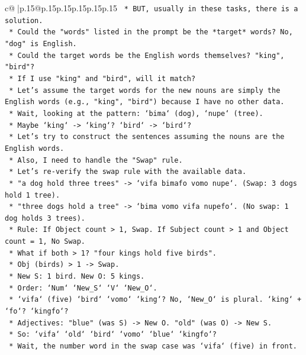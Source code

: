 \documentclass{article}
\begin{document}
{\begin{supertabular}{c@{$\;$}|p{.15\linewidth}@{}p{.15\linewidth}p{.15\linewidth}p{.15\linewidth}p{.15\linewidth}p{.15\linewidth}}
{{{\texttt{    *   BUT, usually in these tasks, there is a solution.} \\
\texttt{    *   Could the "words" listed in the prompt be the *target* words? No, "dog" is English.} \\
\texttt{    *   Could the target words be the English words themselves? "king", "bird"?} \\
\texttt{    *   If I use "king" and "bird", will it match?} \\
\texttt{    *   Let's assume the target words for the new nouns are simply the English words (e.g., "king", "bird") because I have no other data.} \\
\texttt{    *   Wait, looking at the pattern: `bima` (dog), `nupe` (tree).} \\
\texttt{    *   Maybe `king` {-}> `king`? `bird` {-}> `bird`?} \\
\texttt{    *   Let's try to construct the sentences assuming the nouns are the English words.} \\
\texttt{    *   Also, I need to handle the "Swap" rule.} \\
\texttt{    *   Let's re{-}verify the swap rule with the available data.} \\
\texttt{        *   "a dog hold three trees" {-}> `vifa bimafo vomo nupe`. (Swap: 3 dogs hold 1 tree).} \\
\texttt{        *   "three dogs hold a tree" {-}> `bima vomo vifa nupefo`. (No swap: 1 dog holds 3 trees).} \\
\texttt{        *   Rule: If Object count > 1, Swap. If Subject count > 1 and Object count = 1, No Swap.} \\
\texttt{        *   What if both > 1? "four kings hold five birds".} \\
\texttt{        *   Obj (birds) > 1 {-}> Swap.} \\
\texttt{        *   New S: 1 bird. New O: 5 kings.} \\
\texttt{        *   Order: `Num` `New\_S` `V` `New\_O`.} \\
\texttt{        *   `vifa` (five) `bird` `vomo` `king`? No, `New\_O` is plural. `king` + `fo`? `kingfo`?} \\
\texttt{        *   Adjectives: "blue" (was S) {-}> New O. "old" (was O) {-}> New S.} \\
\texttt{        *   So: `vifa` `old` `bird` `vomo` `blue` `kingfo`?} \\
\texttt{        *   Wait, the number word in the swap case was `vifa` (five) in front.} \\
}}}
\end{supertabular}}
\end{document}
